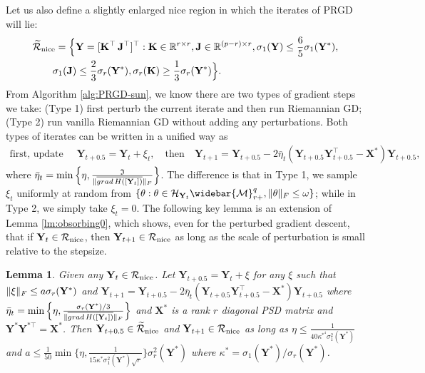 \documentclass[11pt]{article}
\newtheorem{Lemma}{Lemma}
\newcommand{\bbR}{\mathbb{R}}
\newcommand{\cH}{\mathcal{H}}
\newcommand{\0}{{\mathbf{0}}}
\newcommand{\1}{{\mathbf{1}}}
\newcommand{\X}{{\mathbf{X}}}
\newcommand{\K}{{\mathbf{K}}}
\newcommand{\J}{{\mathbf{J}}}
\newcommand{\Y}{{\mathbf{Y}}}
\newcommand{\cR}{{\cal R}}
\newcommand{\cM}{{\cal M}}
\newcommand{\grad}{{\rm grad}}
\newcommand{\F}{{\rm F}}
\begin{document}
{Let us also define a slightly enlarged nice region in which the iterates of PRGD will lie:
\begin{equation} \label{def:R-nice}
	\begin{split}
		&\widetilde{\cR}_{\text{nice}} = \Big \{ \Y = [\K^\top \, \J^{\top}]^{\top}: \K \in \bbR^{r \times r}, \J \in \bbR^{(p-r) \times r}, \sigma_1(\Y) \leq \frac{6}{5} \sigma_1(\Y^*),\\
		& \quad \quad  \sigma_1(\J) \leq \frac{2}{3} \sigma_r(\Y^*), \sigma_r(\K) \geq \frac{1}{3} \sigma_r(\Y^*) \Big \}.
	\end{split}
\end{equation} From Algorithm \ref{alg:PRGD-sun}, we know there are two types of gradient steps we take: (Type 1) first perturb the current iterate and then run Riemannian GD; (Type 2) run vanilla Riemannian GD without adding any perturbations. Both types of iterates can be written in a unified way as
\begin{equation*}
	\begin{split}
		\text{first, update }\quad \Y_{t+0.5} = \Y_t + \xi_t, \quad \text{then} \quad \Y_{t+1} = \Y_{t+0.5}- 2\bar{\eta}_t (\Y_{t+0.5}\Y^{\top }_{t+0.5} - \X^*) \Y_{t+0.5},
	\end{split}
\end{equation*} where $\bar{\eta}_t =  \min\left\{\eta, \frac{\mathfrak{I}}{\|\overline{\grad\, H([\Y_t])}\|_{\F}} \right\} $. The difference is that in Type 1, we sample $\xi_t$ uniformly at random from $\{ \theta: \theta \in \cH_{\Y_{t}}\widebar{\cM}_{r+}^{q}, \|\theta\|_{\F} \leq \omega \}$; while in Type 2, we simply take $\xi_t = 0$. The following key lemma is an extension of Lemma \ref{lm:obsorbing0}, which shows, even for the perturbed gradient descent, that if $\Y_t \in \cR_{\text{nice}}$, then $\Y_{t+1} \in \cR_{\text{nice}}$ as long as the scale of perturbation is small relative to the stepsize.

\begin{Lemma}\label{lm:obsorbing}
	Given any $\Y_t \in \cR_{\text{nice}}$. Let $\Y_{t+0.5} = \Y_t + \xi$ for any $\xi$ such that $\|\xi\|_\F \leq a \sigma_r(\Y^*)$ and ${\Y}_{t+1} = \Y_{t+0.5} - 2\bar{\eta}_t (\Y_{t+0.5} \Y_{t+0.5}^{\top} - \X^*)\Y_{t+0.5}$ where $\bar{\eta}_t =  \min\left\{\eta, \frac{ \sigma_r(\Y^*)/3 }{\|\overline{\grad\, H([\Y_t])}\|_{\F}} \right\} $ and $\X^*$ is a rank $r$ diagonal PSD matrix and $\Y^* \Y^{*\top } = \X^*$. Then $\Y_{t+0.5} \in \widetilde{\cR}_{\text{nice}}$ and ${\Y}_{t+1} \in \cR_{\text{nice}}$ as long as $\eta \leq  \frac{1}{40 \kappa^{*^4} \sigma^2_1(\Y^*) } $ and $a \leq \frac{1}{50} \min \{ \eta, \frac{1}{15 \kappa^* \sigma^2_1(\Y^*) \sqrt{r} }\} \sigma_r^2(\Y^*)$ where $\kappa^* = \sigma_1(\Y^*)/\sigma_r(\Y^*)$.
\end{Lemma}


}
\end{document}
